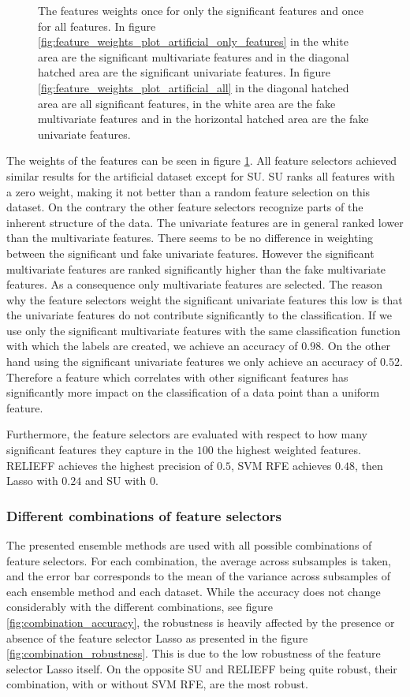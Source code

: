 \documentclass[twoside,11pt]{article}
\begin{document}
\begin{figure}
  \caption{The features weights once for only the significant features and once for all features. In figure \ref{fig:feature_weights_plot_artificial_only_features} in the white area are the significant multivariate features and in the diagonal hatched area are the significant univariate features. In figure \ref{fig:feature_weights_plot_artificial_all} in the diagonal hatched area are all significant features, in the white area are the fake multivariate features and in the horizontal hatched area are the fake univariate features. }
  \label{fig:feature_weights_plot_artificial}
\end{figure}
The weights of the features can be seen in figure \ref{fig:feature_weights_plot_artificial}.
All feature selectors achieved similar results for the artificial dataset except for SU. SU ranks all features with a zero weight, making it not better than a random feature selection on this dataset. On the contrary the other feature selectors recognize parts of the inherent structure of the data. The univariate features are in general ranked lower than the multivariate features. There seems to be no difference in weighting between the significant und fake univariate features. However the significant multivariate features are ranked significantly higher than the fake multivariate features. As a consequence only multivariate features are selected. The reason why the feature selectors weight the significant univariate features this low is that the univariate features do not contribute significantly to the classification. If we use only the significant multivariate features with the same classification function with which the labels are created, we achieve an accuracy of $0.98$. On the other hand using the significant univariate features we only achieve an accuracy of $0.52$. Therefore a feature which correlates with other significant features has significantly more impact on the classification of a data point than a uniform feature.

Furthermore, the feature selectors are evaluated with respect to how many significant features they capture in the $100$ the highest weighted features. RELIEFF achieves the highest precision of $0.5$, SVM RFE achieves $0.48$, then Lasso with $0.24$ and SU with $0$.

\subsubsection{Different combinations of feature selectors}
The presented ensemble methods are used with all possible combinations of feature selectors. For each combination, the average across subsamples  is taken, and the error bar corresponds to the mean of the variance across subsamples of each ensemble method and each dataset. While the accuracy does not change considerably with the different combinations, see figure \ref{fig:combination_accuracy}, the robustness is heavily affected by the presence or absence of the feature selector Lasso as presented in the figure \ref{fig:combination_robustness}. This is due to the low robustness of the feature selector Lasso itself. On the opposite SU and RELIEFF being quite robust, their combination, with or without SVM RFE, are the most robust.  
\end{document}

